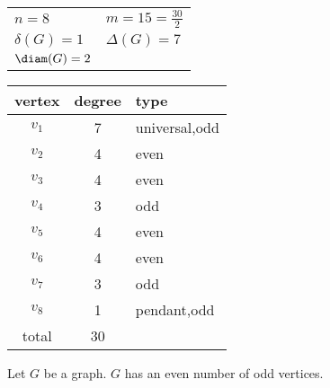 \documentclass[letterpaper,12pt,fleqn]{article}
\renewcommand{\d}{\delta}
\newcommand{\D}{\Delta}
\begin{document}
\begin{example}
  \begin{minipage}[t]{3in}
    \begin{center}
      \vspace{0pt}

      \bigskip

      \begin{tabular}{ll}
        \(n=8\) & \(m=15=\frac{30}{2}\) \\
        \(\d(G)=1\) & \(\D(G)=7\) \\
        \(\diam(G)=2\)
      \end{tabular}
    \end{center}
  \end{minipage}
  \begin{minipage}[t]{3in}
    \vspace{0pt}
    \begin{tabular}{c|c|l}
      vertex & degree & type \\
      \hline
      \(v_1\) & 7 & universal,odd \\
      \(v_2\) & 4 & even \\
      \(v_3\) & 4 & even \\
      \(v_4\) & 3 & odd \\
      \(v_5\) & 4 & even \\
      \(v_6\) & 4 & even \\
      \(v_7\) & 3 & odd \\
      \(v_8\) & 1 & pendant,odd \\
      \hline
      total & 30 &
    \end{tabular}
  \end{minipage}
\end{example}

\begin{theorem}
  Let \(G\) be a graph.  \(G\) has an even number of odd vertices.
\end{theorem}
\end{document}
